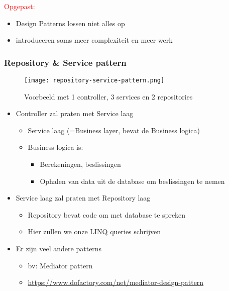\documentclass{article}
\begin{document}
\textcolor{red}{Opgepast:}

\begin{itemize}
    \item Design Patterns lossen niet alles op
    \item introduceren soms meer complexiteit en meer werk
\end{itemize}

\subsubsection{Repository \& Service pattern}

\begin{figure}[H]
    \centering
    \texttt{[image: repository-service-pattern.png]}
    \caption{Voorbeeld met 1 controller, 3 services en 2 repositories}
\end{figure}

\begin{itemize}
    \item Controller zal praten met Service laag
    \begin{itemize}
        \item Service laag (=Business layer, bevat de Business logica)
        \item Business logica is:
        \begin{itemize}
            \item Berekeningen, beslissingen
            \item Ophalen van data uit de database om beslissingen te nemen
        \end{itemize}
    \end{itemize}
    \item Service laag zal praten met Repository laag
    \begin{itemize}
        \item Repository bevat code om met database te spreken
        \item Hier zullen we onze LINQ queries schrijven
    \end{itemize}
    \item Er zijn veel andere patterns
    \begin{itemize}
        \item bv: Mediator pattern 
        \item \url{https://www.dofactory.com/net/mediator-design-pattern}
    \end{itemize}
\end{itemize}
\end{document}
